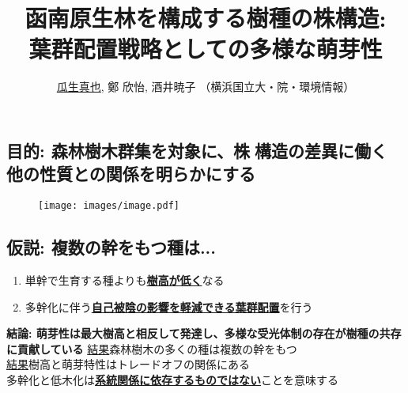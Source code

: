 \documentclass[a0, 30pt, plainboxedsections]{sciposter} %
\title{\textcolor{Blue1}{函南原生林を構成する樹種の株構造:\\\vspace{-0.2em} 葉群配置戦略としての多様な萌芽性}}
\author{\underline{瓜生真也}, 鄭 欣怡, 酒井暁子 （横浜国立大・院・環境情報） \normalsize{\faEnvelope \hspace{0.02em} \fontspec{GillSans-Italic}{suika1127@gmail.com}}}
\begin{document}
\maketitle
\vspace{-2em}
\begin{multicols}{2}
\begin{mdframed}[style=section.frame]
  \centering\huge\textbf{}
\end{mdframed}

\subsection*{目的: 森林樹木群集を対象に、株構造の差異に働く\\他の性質との関係を明らかにする}

\begin{figure}
  \centering\texttt{[image: images/image.pdf]}
\end{figure}

\vspace{-0.8em}
\subsection*{仮説: 複数の幹をもつ種は...}

\begin{enumerate}\setlength{\itemindent}{1em}
\item 単幹で生育する種よりも\underline{\textbf{樹高が低く}}なる
\item 多幹化に伴う\underline{\textbf{自己被陰の影響を軽減できる葉群配置}}を行う
\end{enumerate}

\columnbreak
\begin{mdframed}[style=conclusion.frame]
  \large\textbf{\faFlagAlt \vspace{0.02em} 結論: {萌芽性は最大樹高と相反して発達し、多様な受光体制の存在が樹種の共存に貢献している}}
  \vspace{0.4em}
  \flushleft
  \normalsize{\underline{結果}森林樹木の多くの種は複数の幹をもつ\\
  \underline{結果}樹高と萌芽特性はトレードオフの関係にある\\
  }
  \large{\faHandLeft \vspace{0.02em} 多幹化と低木化は\textbf{\underline{系統関係に依存するものではない}}ことを意味する} %
  

\end{mdframed}
\end{multicols}
\end{document}
